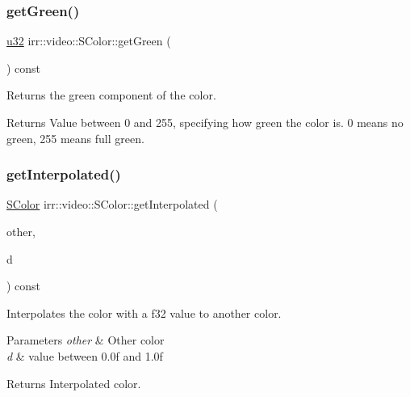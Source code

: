 \subsubsection{\texorpdfstring{get\+Green()}{getGreen()}}
{\footnotesize\ttfamily \hyperlink{namespaceirr_a0416a53257075833e7002efd0a18e804}{u32} irr\+::video\+::\+S\+Color\+::get\+Green (\begin{DoxyParamCaption}{ }\end{DoxyParamCaption}) const\hspace{0.3cm}{\ttfamily [inline]}}



Returns the green component of the color. 

\begin{DoxyReturn}{Returns}
Value between 0 and 255, specifying how green the color is. 0 means no green, 255 means full green. 
\end{DoxyReturn}
\mbox{\label{classirr_1_1video_1_1SColor_a20bfa471b5cf672db83355c181a3cae6}} 
\subsubsection{\texorpdfstring{get\+Interpolated()}{getInterpolated()}}
{\footnotesize\ttfamily \hyperlink{classirr_1_1video_1_1SColor}{S\+Color} irr\+::video\+::\+S\+Color\+::get\+Interpolated (\begin{DoxyParamCaption}\item[{const \hyperlink{classirr_1_1video_1_1SColor}{S\+Color} \&}]{other,  }\item[{\hyperlink{namespaceirr_a0277be98d67dc26ff93b1a6a1d086b07}{f32}}]{d }\end{DoxyParamCaption}) const\hspace{0.3cm}{\ttfamily [inline]}}



Interpolates the color with a f32 value to another color. 


\begin{DoxyParams}{Parameters}
{\em other} & Other color \\
\hline
{\em d} & value between 0.\+0f and 1.\+0f \\
\hline
\end{DoxyParams}
\begin{DoxyReturn}{Returns}
Interpolated color. 
\end{DoxyReturn}
\mbox{\label{classirr_1_1video_1_1SColor_addb63c4b8832c9bb01e4861e692e5f4f}} 
